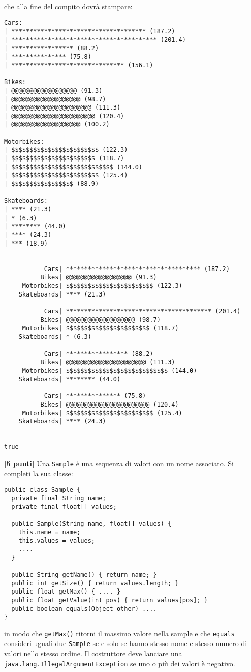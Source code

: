\documentclass{article}[10pt]
\newcounter{esnu}
\newenvironment{esercizio}{\medskip \noindent {\bf Esercizio\addtocounter{esnu}{1} \arabic{esnu}}}{}
\begin{document}
\noindent
che alla fine del compito dovr\`a stampare:
%
{\scriptsize
\begin{verbatim}
Cars:
| ************************************* (187.2)
| **************************************** (201.4)
| ***************** (88.2)
| *************** (75.8)
| ******************************* (156.1)

Bikes:
| @@@@@@@@@@@@@@@@@@ (91.3)
| @@@@@@@@@@@@@@@@@@@ (98.7)
| @@@@@@@@@@@@@@@@@@@@@@ (111.3)
| @@@@@@@@@@@@@@@@@@@@@@@ (120.4)
| @@@@@@@@@@@@@@@@@@@ (100.2)

Motorbikes:
| $$$$$$$$$$$$$$$$$$$$$$$$ (122.3)
| $$$$$$$$$$$$$$$$$$$$$$$ (118.7)
| $$$$$$$$$$$$$$$$$$$$$$$$$$$$ (144.0)
| $$$$$$$$$$$$$$$$$$$$$$$$ (125.4)
| $$$$$$$$$$$$$$$$$ (88.9)

Skateboards:
| **** (21.3)
| * (6.3)
| ******** (44.0)
| **** (24.3)
| *** (18.9)


           Cars| ************************************* (187.2)
          Bikes| @@@@@@@@@@@@@@@@@@ (91.3)
     Motorbikes| $$$$$$$$$$$$$$$$$$$$$$$$ (122.3)
    Skateboards| **** (21.3)

           Cars| **************************************** (201.4)
          Bikes| @@@@@@@@@@@@@@@@@@@ (98.7)
     Motorbikes| $$$$$$$$$$$$$$$$$$$$$$$ (118.7)
    Skateboards| * (6.3)

           Cars| ***************** (88.2)
          Bikes| @@@@@@@@@@@@@@@@@@@@@@ (111.3)
     Motorbikes| $$$$$$$$$$$$$$$$$$$$$$$$$$$$ (144.0)
    Skateboards| ******** (44.0)

           Cars| *************** (75.8)
          Bikes| @@@@@@@@@@@@@@@@@@@@@@@ (120.4)
     Motorbikes| $$$$$$$$$$$$$$$$$$$$$$$$ (125.4)
    Skateboards| **** (24.3)


true
\end{verbatim}
}

\begin{esercizio}
\textbf{[5 punti]}
Una \texttt{Sample} \`e una sequenza di valori con un nome associato. Si completi la sua classe:

{\small
\begin{verbatim}
public class Sample {
  private final String name;
  private final float[] values;

  public Sample(String name, float[] values) {
    this.name = name;
    this.values = values;
    ....
  }

  public String getName() { return name; }
  public int getSize() { return values.length; }
  public float getMax() { .... }
  public float getValue(int pos) { return values[pos]; }
  public boolean equals(Object other) ....
}
\end{verbatim}}

\noindent
in modo che \texttt{getMax()} ritorni il massimo valore nella sample e che
\texttt{equals} consideri uguali due \texttt{Sample} se e solo se hanno stesso nome e stesso
numero di valori nello stesso ordine. Il costruttore deve lanciare una
\texttt{java.lang.IllegalArgumentException} se uno o pi\`u dei valori \`e negativo.
\end{esercizio}
\end{document}
